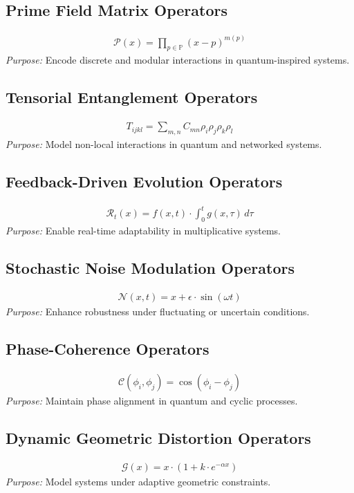 \documentclass{article}
\theoremstyle{plain}
\begin{document}
   \subsection{Prime Field Matrix Operators}
    \begin{align}
        \mathcal{P}(x) = \prod_{p \in \mathbb{P}} (x - p)^{m(p)}
    \end{align}
    \textit{Purpose:} Encode discrete and modular interactions in quantum-inspired systems.

\subsection{Tensorial Entanglement Operators}
    \begin{align}
        T_{ijkl} = \sum_{m,n} C_{mn} \rho_i \rho_j \rho_k \rho_l
    \end{align}
    \textit{Purpose:} Model non-local interactions in quantum and networked systems.

\subsection{Feedback-Driven Evolution Operators}
    \begin{align}
        \mathcal{R}_t(x) = f(x, t) \cdot \int_0^t g(x, \tau) \, d\tau
    \end{align}
    \textit{Purpose:} Enable real-time adaptability in multiplicative systems.

\subsection{Stochastic Noise Modulation Operators}
    \begin{align}
        \mathcal{N}(x, t) = x + \epsilon \cdot \sin(\omega t)
    \end{align}
    \textit{Purpose:} Enhance robustness under fluctuating or uncertain conditions.

\subsection{Phase-Coherence Operators}
    \begin{align}
        \mathcal{C}(\phi_i, \phi_j) = \cos(\phi_i - \phi_j)
    \end{align}
    \textit{Purpose:} Maintain phase alignment in quantum and cyclic processes.

\subsection{Dynamic Geometric Distortion Operators}
    \begin{align}
        \mathcal{G}(x) = x \cdot (1 + k \cdot e^{-\alpha x})
    \end{align}
    \textit{Purpose:} Model systems under adaptive geometric constraints.
\end{document}
